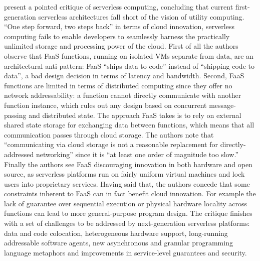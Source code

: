 \textcite{hellerstein18twoStepsBack} present a pointed critique of serverless computing, concluding that current first-generation serverless architectures fall short of the vision of utility computing. ``One step forward, two steps back'' in terms of cloud innovation, serverless computing fails to enable developers to seamlessly harness the practically unlimited storage and processing power of the cloud. First of all the authors observe that FaaS functions, running on isolated VMs separate from data, are an architectural anti-pattern: FaaS ``ships data to code'' instead of ``shipping code to data'', a bad design decision in terms of latency and bandwidth. Second, FaaS functions are limited in terms of distributed computing since they offer no network addressability: a function cannot directly communicate with another function instance, which rules out any design based on concurrent message-passing and distributed state. The approach FaaS takes is to rely on external shared state storage for exchanging data between functions, which means that all communication passes through cloud storage. The authors note that ``communicating via cloud storage is not a reasonable replacement for directly-addressed networking'' since it is ``at least one order of magnitude too slow.'' Finally the authors see FaaS discouraging innovation in both hardware and open source, as serverless platforms run on fairly uniform virtual machines and lock users into proprietary services. Having said that, the authors concede that some constraints inherent to FaaS can in fact benefit cloud innovation. For example the lack of guarantee over sequential execution or physical hardware locality across functions can lead to more general-purpose program design. The critique finishes with a set of challenges to be addressed by next-generation serverless platforms: data and code colocation, heterogeneous hardware support, long-running addressable software agents, new asynchronous and granular programming language metaphors and improvements in service-level guarantees and security.


